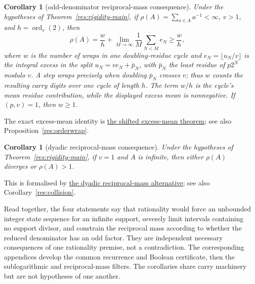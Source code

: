 \documentclass[11pt]{article}
\newcommand{\commit}{ebc98ee71f6819bd9fe344a0bb343542c604e533}
\newcommand{\repobase}{https://github.com/wcook04/plectis-lean-erdos249-257/blob/\commit}
\newcommand{\PK}{Erdos249257}
\newcommand{\lword}[4]{\href{\repobase/\PK/#1\#L#2}{#4}}
\newtheorem{corollary}[theorem]{Corollary}
\theoremstyle{definition}
\theoremstyle{remark}
\begin{document}
\begin{corollary}[odd-denominator reciprocal-mass consequence]
\label{res:rigidity-mass-main}
Under the hypotheses of Theorem~\ref{res:rigidity-main}, if
\(\rho(A)=\sum_{a\in A}a^{-1}<\infty\), \(v>1\), and
\(h=\operatorname{ord}_v(2)\), then
\[
 \rho(A)=\frac{w}{h}
   +\lim_{M\to\infty}\frac1M\sum_{N<M}e_N\geq\frac{w}{h},
\]
where \(w\) is the number of wraps in one doubling-residue cycle and
\(e_N=\lfloor u_N/v\rfloor\) is the integral excess in the split
\(u_N=ve_N+\bar p_N\), with \(\bar p_N\) the least residue of
\(p2^N\) modulo \(v\).  A step wraps precisely when doubling
\(\bar p_N\) crosses \(v\); thus \(w\) counts the resulting carry digits
over one cycle of length \(h\).  The term \(w/h\) is the cycle's mean
residue contribution, while the displayed excess mean is nonnegative.  If
\((p,v)=1\), then \(w\geq1\).
\end{corollary}
\noindent The exact excess-mean identity is
\lword{RationalSupportCarrySkeleton.lean}{1577}{exists_shifted_oddTailExcess_mean_of_support_fraction}{the shifted excess-mean theorem};
see also Proposition~\ref{res:orderwrap}.

\begin{corollary}[dyadic reciprocal-mass consequence]
\label{res:rigidity-dyadic-mass-main}
Under the hypotheses of Theorem~\ref{res:rigidity-main}, if \(v=1\) and
\(A\) is infinite, then either \(\rho(A)\) diverges or \(\rho(A)>1\).
\end{corollary}
\noindent This is formalised by
\lword{RationalSupportCarrySkeleton.lean}{2200}{dyadic_support_fraction_reciprocalMass_diverges_or_gt_one}{the dyadic reciprocal-mass alternative};
see also Corollary~\ref{res:collision}.

Read together, the four statements say that rationality would force an
unbounded integer state sequence for an infinite support, severely limit
intervals containing no support divisor, and constrain the reciprocal mass
according to whether the reduced denominator has an odd factor.  They are
independent necessary consequences of one rationality premise, not a
contradiction.
The corresponding appendices develop the common recurrence and Boolean
certificate, then the sublogarithmic and reciprocal-mass filters.  The
corollaries share carry machinery but are not hypotheses of one another.
\end{document}
